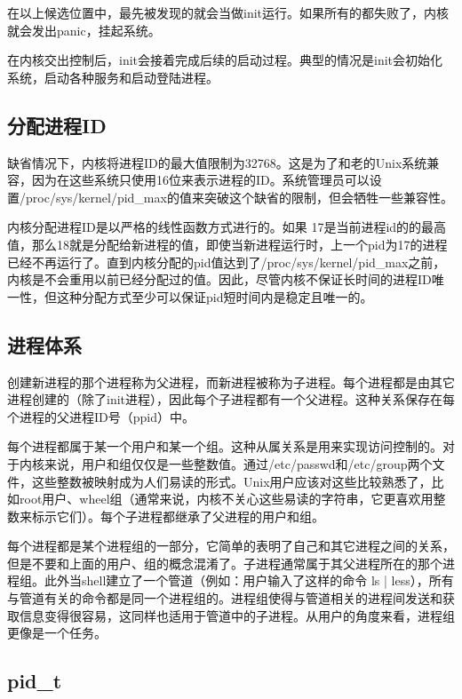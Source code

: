 在以上候选位置中，最先被发现的就会当做init运行。如果所有的都失败了，内核就会发出panic，挂起系统。

在内核交出控制后，init会接着完成后续的启动过程。典型的情况是init会初始化系统，启动各种服务和启动登陆进程。

\subsection{分配进程ID}

缺省情况下，内核将进程ID的最大值限制为32768。这是为了和老的Unix系统兼容，因为在这些系统只使用16位来表示进程的ID。系统管理员可以设置/proc/sys/kernel/pid\_max的值来突破这个缺省的限制，但会牺牲一些兼容性。

内核分配进程ID是以严格的线性函数方式进行的。如果 17是当前进程id的的最高值，那么18就是分配给新进程的值，即使当新进程运行时，上一个pid为17的进程已经不再运行了。直到内核分配的pid值达到了/proc/sys/kernel/pid\_max之前，内核是不会重用以前已经分配过的值。因此，尽管内核不保证长时间的进程ID唯一性，但这种分配方式至少可以保证pid短时间内是稳定且唯一的。
 
\subsection{进程体系}

创建新进程的那个进程称为父进程，而新进程被称为子进程。每个进程都是由其它进程创建的（除了init进程），因此每个子进程都有一个父进程。这种关系保存在每个进程的父进程ID号（ppid）中。

每个进程都属于某一个用户和某一个组。这种从属关系是用来实现访问控制的。对于内核来说，用户和组仅仅是一些整数值。通过/etc/passwd和/etc/group两个文件，这些整数被映射成为人们易读的形式。Unix用户应该对这些比较熟悉了，比如root用户、wheel组（通常来说，内核不关心这些易读的字符串，它更喜欢用整数来标示它们）。每个子进程都继承了父进程的用户和组。

每个进程都是某个进程组的一部分，它简单的表明了自己和其它进程之间的关系，但是不要和上面的用户、组的概念混淆了。子进程通常属于其父进程所在的那个进程组。此外当shell建立了一个管道（例如：用户输入了这样的命令 ls | less），所有与管道有关的命令都是同一个进程组的。进程组使得与管道相关的进程间发送和获取信息变得很容易，这同样也适用于管道中的子进程。从用户的角度来看，进程组更像是一个任务。

\subsection{pid\_t}

